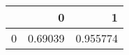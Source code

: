 \begin{tabular}{lrr}
\toprule
{} &        0 &         1 \\
\midrule
0 &  0.69039 &  0.955774 \\
\bottomrule
\end{tabular}
